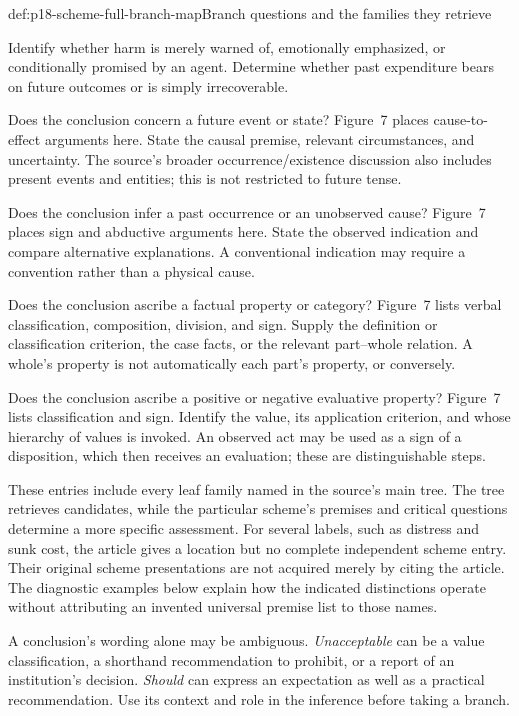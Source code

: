 \begin{hbmethod}{def:p18-scheme-full-branch-map}{Branch questions and the families they retrieve}
\begin{description}
Identify whether harm is merely warned of, emotionally emphasized,
or conditionally promised by an agent. Determine whether past
expenditure bears on future outcomes or is simply irrecoverable.
\item[Internal judgment: prediction.]
Does the conclusion concern a future event or state?
Figure~7 places cause-to-effect arguments here. State the causal
premise, relevant circumstances, and uncertainty.
The source's broader occurrence/existence discussion also includes
present events and entities; this is not restricted to future tense.
\item[Internal judgment: retrodiction.]
Does the conclusion infer a past occurrence or an unobserved cause?
Figure~7 places sign and abductive arguments here.
State the observed indication and compare alternative explanations.
A conventional indication may require a convention rather than a
physical cause.
\item[Internal judgment: factual classification.]
Does the conclusion ascribe a factual property or category?
Figure~7 lists verbal classification, composition, division, and sign.
Supply the definition or classification criterion, the case facts,
or the relevant part--whole relation. A whole's property is not
automatically each part's property, or conversely.
\item[Internal judgment: value classification.]
Does the conclusion ascribe a positive or negative evaluative property?
Figure~7 lists classification and sign. Identify the value,
its application criterion, and whose hierarchy of values is invoked.
An observed act may be used as a sign of a disposition, which then
receives an evaluation; these are distinguishable steps.
\end{description}
\end{hbmethod}

These entries include every leaf family named in the source's main
tree. The tree retrieves candidates, while the particular scheme's
premises and critical questions determine a more specific assessment.
For several labels, such as distress and sunk cost, the article gives
a location but no complete independent scheme entry. Their original
scheme presentations are not acquired merely by citing the article.
The diagnostic examples below explain how the indicated distinctions
operate without attributing an invented universal premise list to
those names.

A conclusion's wording alone may be ambiguous. \emph{Unacceptable}
can be a value classification, a shorthand recommendation to prohibit,
or a report of an institution's decision. \emph{Should} can express
an expectation as well as a practical recommendation.
Use its context and role in the inference before taking a branch.

